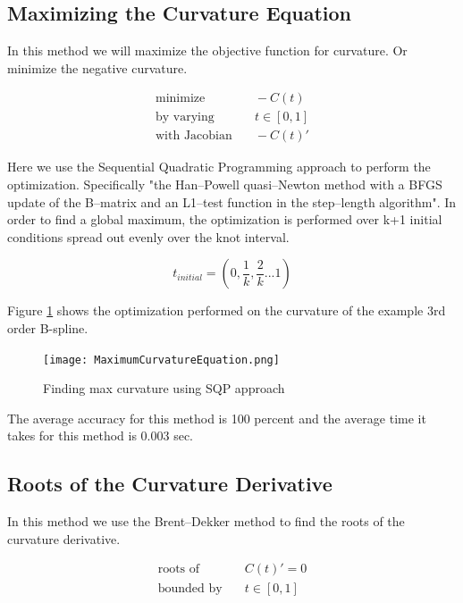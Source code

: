 \documentclass{article}
\begin{document}
\subsection{Maximizing the Curvature Equation}

In this method we will maximize the objective function for curvature. Or minimize the negative curvature.

\begin{equation}
\begin{aligned}
    \text{minimize} & \quad -C(t) \\
    \text{by varying} & \quad t \in [0,1] \\
    \text{with Jacobian} & \quad -C(t)' 
\end{aligned}
\end{equation}

Here we use the Sequential Quadratic Programming approach to perform the optimization. Specifically "the Han–Powell quasi–Newton method with a BFGS update of the B–matrix and an L1–test function in the step–length algorithm". In order to find a global maximum, the optimization is performed over k+1 initial conditions spread out evenly over the knot interval.

\begin{equation}
    t_{initial} = (0, \frac{1}{k}, \frac{2}{k} ... 1) 
\end{equation}

Figure \ref{Maximum Curvature} shows the optimization performed on the curvature of the example 3rd order B-spline.

\begin{figure}[H]
\centering
\texttt{[image: MaximumCurvatureEquation.png]}
\caption{Finding max curvature using SQP approach}
\label{Maximum Curvature}
\end{figure}

The average accuracy for this method is 100 percent and the average time it takes for this method is 0.003 sec.

\subsection{Roots of the Curvature Derivative}

In this method we use the Brent–Dekker method to find the roots of the curvature derivative.

\begin{equation}
\begin{aligned}
    \text{roots of} & \quad C(t)' = 0 \\
    \text{bounded by} & \quad t \in [0,1] \\
\end{aligned}
\end{equation}
\end{document}
